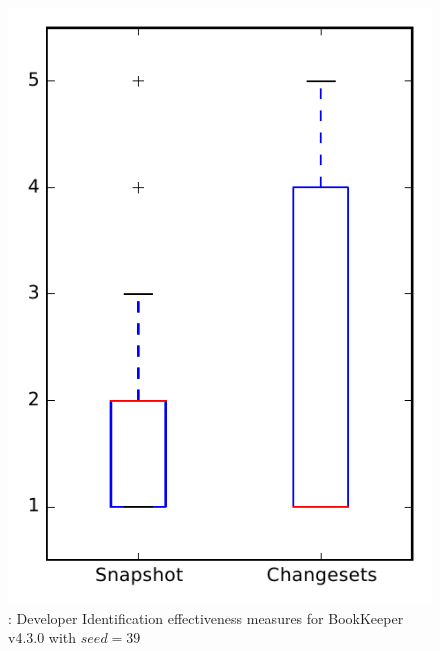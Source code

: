 
\begin{figure}
\centering
\includegraphics[height=0.4\textheight]{figures/dit_seed/rq1_bookkeeper_39}
\caption{\rtwo: Developer Identification effectiveness measures for BookKeeper v4.3.0 with $seed=39$}
\label{fig:dit_seed:rq1:bookkeeper}
\end{figure}
